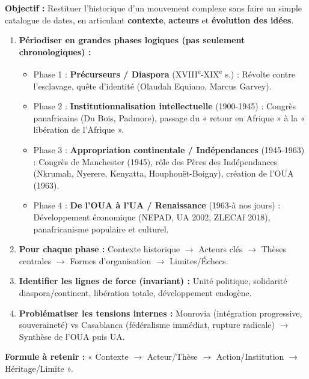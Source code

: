 \documentclass[11pt]{article}
\newcommand{\cle}[1]{{\popxbold\color{popdark}#1}}
\begin{document}
\begin{methode}
\textbf{Objectif :} Restituer l'historique d'un mouvement complexe sans faire un simple catalogue de dates, en articulant \textbf{contexte}, \textbf{acteurs} et \textbf{évolution des idées}.
\begin{enumerate}
    \item \textbf{Périodiser en grandes phases logiques (pas seulement chronologiques) :}
        \begin{itemize}
            \item Phase 1 : \textbf{Précurseurs / Diaspora} (XVIII\textsuperscript{e}-XIX\textsuperscript{e} s.) : Révolte contre l'esclavage, quête d'identité (\cle{Olaudah Equiano}, \cle{Marcus Garvey}).
            \item Phase 2 : \textbf{Institutionnalisation intellectuelle} (1900-1945) : Congrès panafricains (\cle{Du Bois}, \cle{Padmore}), passage du « retour en Afrique » à la « libération de l'Afrique ».
            \item Phase 3 : \textbf{Appropriation continentale / Indépendances} (1945-1963) : Congrès de Manchester (1945), rôle des \cle{Pères des Indépendances} (Nkrumah, Nyerere, Kenyatta, Houphouët-Boigny), création de l'OUA (1963).
            \item Phase 4 : \textbf{De l'OUA à l'UA / Renaissance} (1963-à nos jours) : Développement économique (NEPAD, UA 2002, ZLECAf 2018), panafricanisme populaire et culturel.
        \end{itemize}
    \item \textbf{Pour chaque phase :} Contexte historique $\rightarrow$ Acteurs clés $\rightarrow$ Thèses centrales $\rightarrow$ Formes d'organisation $\rightarrow$ Limites/Échecs.
    \item \textbf{Identifier les lignes de force (invariant) :} Unité politique, solidarité diaspora/continent, libération totale, développement endogène.
    \item \textbf{Problématiser les tensions internes :} \cle{Monrovia} (intégration progressive, souveraineté) vs \cle{Casablanca} (fédéralisme immédiat, rupture radicale) $\rightarrow$ Synthèse de l'OUA puis UA.
\end{enumerate}
\textbf{Formule à retenir :} « Contexte $\rightarrow$ Acteur/Thèse $\rightarrow$ Action/Institution $\rightarrow$ Héritage/Limite ».
\end{methode}
\end{document}
